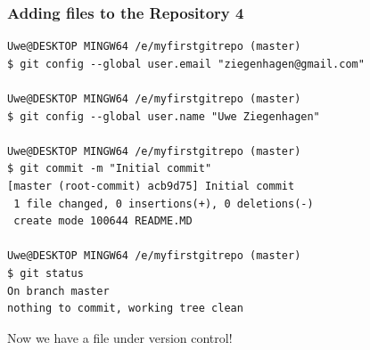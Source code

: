 \documentclass[12pt,english]{beamer}
\begin{document}
\begin{frame}[containsverbatim]
\frametitle{Adding files to the Repository 4} 

\begin{lstlisting}[basicstyle=\ttfamily\scriptsize]
Uwe@DESKTOP MINGW64 /e/myfirstgitrepo (master)
$ git config --global user.email "ziegenhagen@gmail.com"

Uwe@DESKTOP MINGW64 /e/myfirstgitrepo (master)
$ git config --global user.name "Uwe Ziegenhagen"

Uwe@DESKTOP MINGW64 /e/myfirstgitrepo (master)
$ git commit -m "Initial commit"
[master (root-commit) acb9d75] Initial commit
 1 file changed, 0 insertions(+), 0 deletions(-)
 create mode 100644 README.MD

Uwe@DESKTOP MINGW64 /e/myfirstgitrepo (master)
$ git status
On branch master
nothing to commit, working tree clean
\end{lstlisting}

Now we have a file under version control! 

\end{frame}


 
\end{document}
